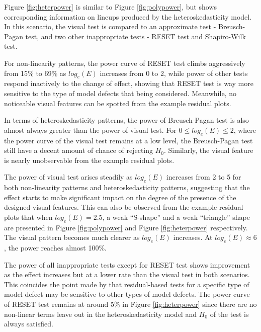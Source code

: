 \documentclass[]{interact}
\theoremstyle{plain}%
\theoremstyle{definition}
\theoremstyle{remark}
\begin{document}
Figure \ref{fig:heterpower} is similar to Figure \ref{fig:polypower},
but shows corresponding information on lineups produced by the
heteroskedasticity model. In this scenario, the visual test is compared
to an approximate test - Breusch-Pagan test, and two other inappropriate
tests - RESET test and Shapiro-Wilk test.

For non-linearity patterns, the power curve of RESET test climbs
aggressively from 15\% to 69\% as \(log_e(E)\) increases from 0 to 2,
while power of other tests respond inactively to the change of effect,
showing that RESET test is way more sensitive to the type of model
defects that being considered. Meanwhile, no noticeable visual features
can be spotted from the example residual plots.

In terms of heteroskedasticity patterns, the power of Breusch-Pagan test
is also almost always greater than the power of visual test. For
\(0 \leq log_e(E) \leq 2\), where the power curve of the visual test
remains at a low level, the Breusch-Pagan test still have a decent
amount of chance of rejecting \(H_0\). Similarly, the visual feature is
nearly unobservable from the example residual plots.

The power of visual test arises steadily as \(log_e(E)\) increases from
2 to 5 for both non-linearity patterns and heteroskedasticity patterns,
suggesting that the effect starts to make significant impact on the
degree of the presence of the designed visual features. This can also be
observed from the example residual plots that when \(log_e(E) = 2.5\), a
weak ``S-shape'' and a weak ``triangle'' shape are presented in Figure
\ref{fig:polypower} and Figure \ref{fig:heterpower} respectively. The
visual pattern becomes much clearer as \(log_e(E)\) increases. At
\(log_e(E) \approx 6\), the power reaches almost 100\%.

The power of all inappropriate tests except for RESET test shows
improvement as the effect increases but at a lower rate than the visual
test in both scenarios. This coincides the point made by
\citet{cook1982residuals} that residual-based tests for a specific type
of model defect may be sensitive to other types of model defects. The
power curve of RESET test remains at around 5\% in Figure
\ref{fig:heterpower} since there are no non-linear terms leave out in
the heteroskedasticity model and \(H_0\) of the test is always
satisfied.
\end{document}
